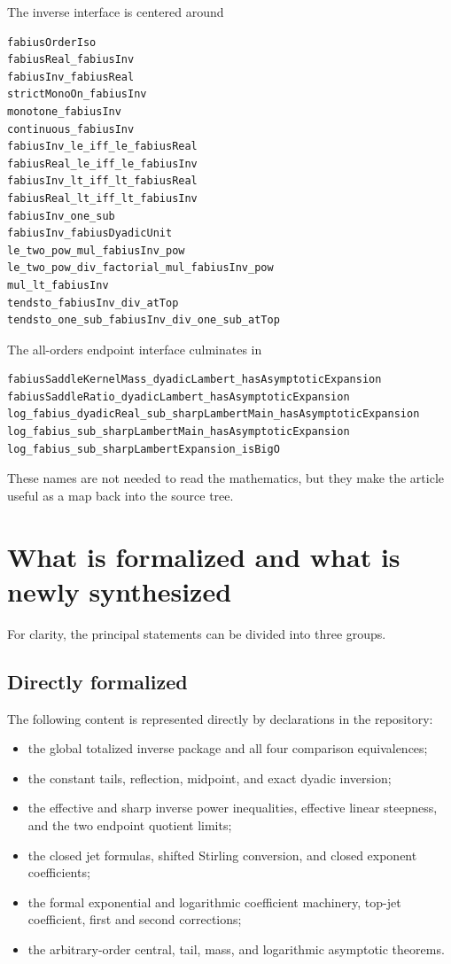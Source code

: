 \documentclass[11pt,oneside]{article}
\theoremstyle{definition}
\theoremstyle{remark}
\begin{document}
The inverse interface is centered around
\begin{lstlisting}[style=pseudo]
fabiusOrderIso
fabiusReal_fabiusInv
fabiusInv_fabiusReal
strictMonoOn_fabiusInv
monotone_fabiusInv
continuous_fabiusInv
fabiusInv_le_iff_le_fabiusReal
fabiusReal_le_iff_le_fabiusInv
fabiusInv_lt_iff_lt_fabiusReal
fabiusReal_lt_iff_lt_fabiusInv
fabiusInv_one_sub
fabiusInv_fabiusDyadicUnit
le_two_pow_mul_fabiusInv_pow
le_two_pow_div_factorial_mul_fabiusInv_pow
mul_lt_fabiusInv
tendsto_fabiusInv_div_atTop
tendsto_one_sub_fabiusInv_div_one_sub_atTop
\end{lstlisting}
The all-orders endpoint interface culminates in
\begin{lstlisting}[style=pseudo]
fabiusSaddleKernelMass_dyadicLambert_hasAsymptoticExpansion
fabiusSaddleRatio_dyadicLambert_hasAsymptoticExpansion
log_fabius_dyadicReal_sub_sharpLambertMain_hasAsymptoticExpansion
log_fabius_sub_sharpLambertMain_hasAsymptoticExpansion
log_fabius_sub_sharpLambertExpansion_isBigO
\end{lstlisting}

These names are not needed to read the mathematics, but they make the
article useful as a map back into the source tree.

\section{What is formalized and what is newly synthesized}
\label{inverse:sec:status-ledger}

For clarity, the principal statements can be divided into three groups.

\subsection{Directly formalized}

The following content is represented directly by declarations in the
repository:
\begin{itemize}
\item the global totalized inverse package and all four comparison
equivalences;
\item the constant tails, reflection, midpoint, and exact dyadic
inversion;
\item the effective and sharp inverse power inequalities, effective
linear steepness, and the two endpoint quotient limits;
\item the closed jet formulas, shifted Stirling conversion, and closed
exponent coefficients;
\item the formal exponential and logarithmic coefficient machinery,
top-jet coefficient, first and second corrections;
\item the arbitrary-order central, tail, mass, and logarithmic
asymptotic theorems.
\end{itemize}
\end{document}
